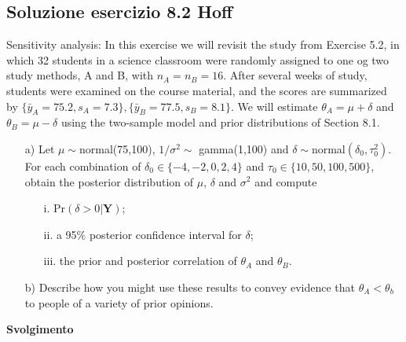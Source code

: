 \subsection{Soluzione esercizio 8.2 Hoff}

Sensitivity analysis: In this exercise we will revisit the study from Exercise 5.2, in which 32 students in a science classroom were randomly assigned to one og two study methods, A and B, with $n_A = n_B = 16$. After several weeks of study, students were examined on the course material, and the scores are summarized by $\{\bar{y}_A = 75.2, s_A = 7.3\}, \{\bar{y}_B = 77.5, s_B = 8.1\}$. We will estimate $\theta_A = \mu+\delta$ and $\theta_B = \mu-\delta$ using the two-sample model and prior distributions of Section 8.1.
\begin{itemize}
	\item[a)] Let $\mu \sim $normal(75,100),  $1/\sigma^2\sim$ gamma(1,100) and $\delta\sim$normal$(\delta_0, \tau^2_0)$. For each combination of $\delta_0 \in \{-4, -2, 0, 2, 4\}$ and $\tau_0 \in \{10, 50, 100, 500\}$, obtain the posterior distribution of $\mu$, $\delta$ and $\sigma^2$ and compute
	\begin{itemize}
		\item[i.] Pr$(\delta>0|\boldsymbol{Y})$;
		\item[ii.] a 95$\%$ posterior confidence interval for $\delta$;
		\item[iii.] the prior and posterior correlation of $\theta_A$ and $\theta_B$.
	\end{itemize}
	\item[b)] Describe how you might use these results to convey evidence that $\theta_A<\theta_b$ to people of a variety of prior opinions.
\end{itemize}

\textbf{Svolgimento}
\bigskip

